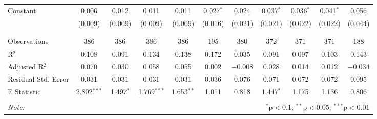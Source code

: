 \begin{table}[H]
\begin{tabular}{@{\extracolsep{4pt}}lcccccccccc}
 Constant & 0.006 & 0.012 & 0.011 & 0.011 & 0.027$^{*}$ & 0.024 & 0.037$^{*}$ & 0.036$^{*}$ & 0.041$^{*}$ & 0.056 \\ 
  & (0.009) & (0.009) & (0.009) & (0.009) & (0.016) & (0.021) & (0.021) & (0.022) & (0.022) & (0.044) \\ 
  & & & & & & & & & & \\ 
\hline \\[-1.8ex] 
Observations & 386 & 386 & 386 & 386 & 195 & 380 & 372 & 371 & 371 & 188 \\ 
R$^{2}$ & 0.108 & 0.091 & 0.134 & 0.138 & 0.172 & 0.035 & 0.091 & 0.097 & 0.103 & 0.143 \\ 
Adjusted R$^{2}$ & 0.070 & 0.030 & 0.058 & 0.055 & 0.002 & $-$0.008 & 0.028 & 0.014 & 0.012 & $-$0.034 \\ 
Residual Std. Error & 0.031 & 0.031 & 0.031 & 0.031 & 0.036 & 0.076 & 0.071 & 0.072 & 0.072 & 0.095 \\ 
F Statistic & 2.802$^{***}$ & 1.497$^{*}$ & 1.769$^{***}$ & 1.653$^{**}$ & 1.011 & 0.818 & 1.447$^{*}$ & 1.175 & 1.136 & 0.806 \\ 
\hline 
\hline \\[-1.8ex] 
\textit{Note:}  & \multicolumn{10}{r}{$^{*}$p$<$0.1; $^{**}$p$<$0.05; $^{***}$p$<$0.01} \\ 
\end{tabular} 
\end{table} 

